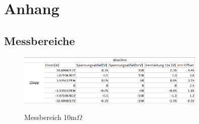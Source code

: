 \section{Anhang}
\subsection{Messbereiche}

\begin{figure}[htbp]
\centering
\includegraphics[width=0.8\textwidth]{Data/Tabelle10mOhm}
\label{fig:Tabelle10mOhm}
\caption[Messbereich 10m$\Omega$]{Messbereich 10m$\Omega$}
\end{figure}


